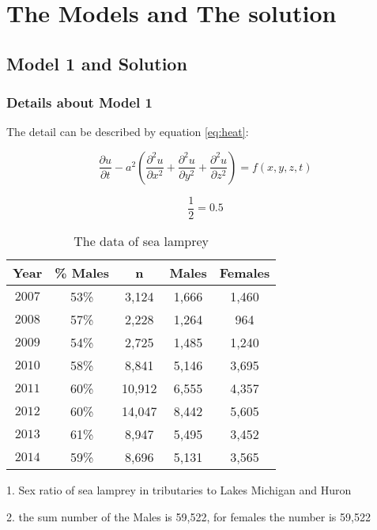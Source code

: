 \documentclass[12pt]{article}  %
\begin{document}
\section{The Models and The solution}

\subsection{Model 1 and Solution}
\subsubsection{Details about Model 1}
The detail can be described by equation \eqref{eq:heat}:

\begin{equation}\label{eq:heat}
\frac{\partial u}{\partial t} - a^2 \left( \frac{\partial^2 u}{\partial x^2} + \frac{\partial^2 u}{\partial y^2} + \frac{\partial^2 u}{\partial z^2} \right) = f(x, y, z, t)
\end{equation}

$$
\frac{1}{2}=0.5
$$

\begin{table}[!htbp]
	\begin{center}
		\begin{threeparttable}
		\caption{The data of sea lamprey}
		\begin{tabular}{ccccc}
			\toprule
			\multicolumn{1}{m{2cm}}{\centering Year}
			&\multicolumn{1}{m{2cm}}{\centering \% Males}
			&\multicolumn{1}{m{2cm}}{\centering n}
			&\multicolumn{1}{m{2cm}}{\centering Males}
			&\multicolumn{1}{m{2cm}}{\centering Females}\\
			\midrule
			$2007$&53\%&3,124&1,666&1,460\\
			$2008$&57\%&2,228&1,264&964\\
			$2009$&54\%&2,725&1,485&1,240\\
			$2010$ &58\%&8,841&5,146&3,695\\
			$2011$ &60\%&10,912&6,555&4,357\\
			$2012$ &60\%&14,047&8,442&5,605\\
			$2013$ &61\%&8,947&5,495&3,452\\
			$2014$ &59\%&8,696&5,131&3,565\\
			\bottomrule
		\end{tabular}\label{tb:002}
		\small
		1. Sex ratio of sea lamprey in tributaries to Lakes Michigan and Huron\cite{3}
		
		2. the sum number of the Males is 59,522, for females the number is 59,522 
		\end{threeparttable}
	\end{center}

\end{table}
\end{document}
